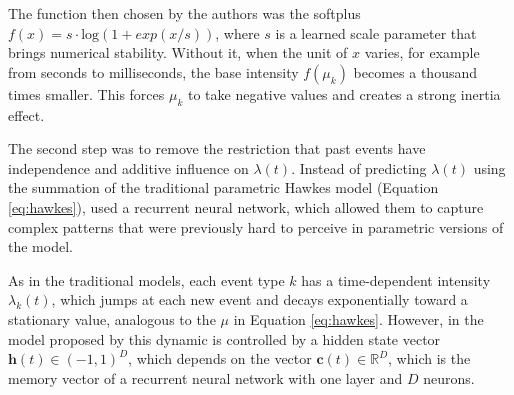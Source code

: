     The function then chosen by the authors was the softplus $f(x) = s \cdot \mathrm{log}(1 + exp(x/s))$, where $s$ is a learned scale parameter that brings numerical stability. Without it, when the unit of $x$ varies, for example from seconds to milliseconds, the base intensity $f(\mu_k)$ becomes a thousand times smaller. This forces $\mu_k$ to take negative values and creates a strong inertia effect.

    The second step was to remove the restriction that past events have independence and additive influence on $\lambda(t)$. Instead of predicting $\lambda(t)$ using the summation of the traditional parametric Hawkes model (Equation \ref{eq:hawkes}),  used a recurrent neural network, which allowed them to capture complex patterns that were previously hard to perceive in parametric versions of the model.

    As in the traditional models, each event type $k$ has a time-dependent intensity $\lambda_k(t)$, which jumps at each new event and decays exponentially toward a stationary value, analogous to the $\mu$ in Equation \ref{eq:hawkes}. However, in the model proposed by  this dynamic is controlled by a hidden state vector $\mathbf{h}(t) \in (-1,1)^D$, which depends on the vector $\mathbf{c}(t) \in \mathbb{R}^D$, which is the memory vector of a recurrent neural network with one layer and $D$ neurons.

